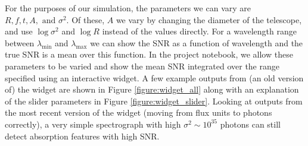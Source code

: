 \documentclass{knac}
\begin{document}
For the purposes of our simulation, the parameters we can vary are $R, f, t, A, \text{ and }\sigma^2$. Of these, $A$ we vary by changing the diameter of the telescope, and use $\log{\sigma^2}$ and $\log{R}$ instead of the values directly. For a wavelength range between $\lambda_\mathrm{min}$ and $\lambda_\mathrm{max}$ we can show the SNR as a function of wavelength and the true SNR is a mean over this function. In the project notebook, we allow these parameters to be varied and show the mean SNR integrated over the range specified using an interactive widget. A few example outputs from (an old version of) the widget are shown in Figure \ref{figure:widget_all} along with an explanation of the slider parameters in Figure \ref{figure:widget_slider}.
Looking at outputs from the most recent version of the widget
(moving from flux units to photons correctly), a very simple spectrograph
with high $\sigma^2 \sim 10^{35}$ photons can still detect absorption
features with high SNR.
\end{document}
